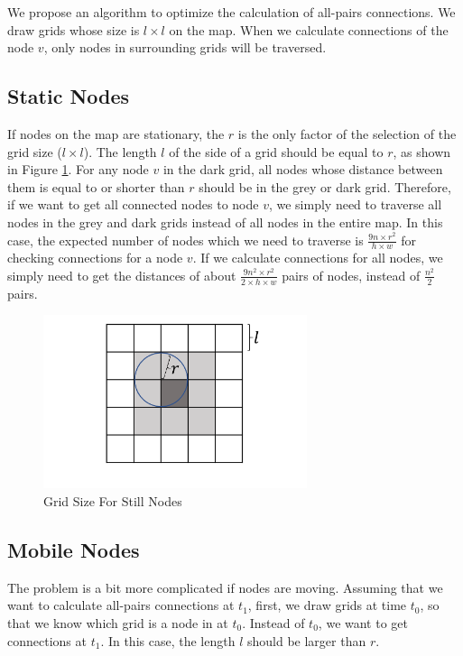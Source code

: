 We propose an algorithm to optimize the calculation of all-pairs connections. We draw grids whose size is $l\times l$ on the map. When we calculate connections of the node $v$, only nodes in surrounding grids will be traversed.


\subsection{ Static Nodes}

\noindent If nodes on the map are stationary, the $r$ is the only factor of the selection of the grid size ($l\times l$). The length $l$ of the side of a grid should be equal to $r$, as shown in Figure \ref{fig:F53GridSizeForStillNodes}. For any node $v$ in the dark grid, all nodes whose distance between them is equal to or shorter than $r$ should be in the grey or dark grid. Therefore, if we want to get all connected nodes to node $v$, we simply need to traverse all nodes in the grey and dark grids instead of all nodes in the entire map. In this case, the expected number of nodes which we need to traverse is $\frac{9n\times r^2}{h\times w}$ for checking connections for a node $v$. If we calculate connections for all nodes, we simply need to get the distances of about $\frac{9n^2\times r^2}{2\times h\times w}$ pairs of nodes, instead of $\frac{n^2}{2}$ pairs.

\begin{figure} [hbtp]
  \centering 
  \includegraphics[height=2in]{figures/F53GridSizeForStillNodes.png}
  \caption{Grid Size For Still Nodes} 
  \label{fig:F53GridSizeForStillNodes} %
\end{figure}


\subsection{ Mobile Nodes}

\noindent The problem is a bit more complicated if nodes are moving. Assuming that we want to calculate all-pairs connections at $t_1$, first, we draw grids at time $t_0$, so that we know which grid is a node in at $t_0$. Instead of $t_0$, we want to get connections at $t_1$. In this case, the length $l$ should be larger than $r$.

